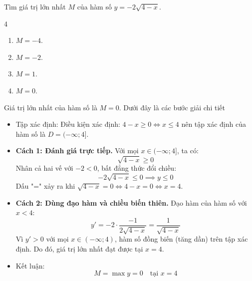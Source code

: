 \begin{baitap}
	Tìm giá trị lớn nhất $M$ của hàm số $y = -2\sqrt{4 - x}$.
	\begin{multicols}{4}
		\begin{enumerate}
			\item $M = -4$.
			\item $M = -2$.
			\item $M = 1$.
			\item $M = 0$.
		\end{enumerate}
	\end{multicols}
	\begin{traloi}
		Giá trị lớn nhất của hàm số là $M = 0$. Dưới đây là các bước giải chi tiết
		\begin{itemize}
			\item Tập xác định: Điều kiện xác định: $4 - x \ge 0 \iff x \le 4$ nên tập xác định của hàm số là $D = (-\infty; 4]$.
			\item \textbf{Cách 1: Đánh giá trực tiếp.}
			Với mọi $x \in (-\infty; 4]$, ta có:$$\sqrt{4 - x} \ge 0$$Nhân cả hai vế với $-2 < 0$, bất đẳng thức đổi chiều:$$-2\sqrt{4 - x} \le 0 \implies y \le 0$$Dấu "=" xảy ra khi $\sqrt{4 - x} = 0 \iff 4 - x = 0 \iff x = 4$.
			\item \textbf{Cách 2: Dùng đạo hàm và chiều biến thiên.} Đạo hàm của hàm số với $x < 4$:$$y' = -2 \cdot \dfrac{-1}{2\sqrt{4 - x}} = \dfrac{1}{\sqrt{4 - x}}$$Vì $y' > 0$ với mọi $x \in (-\infty; 4)$, hàm số đồng biến (tăng dần) trên tập xác định. Do đó, giá trị lớn nhất đạt được tại $x = 4$.
			\item Kết luận:$$M = \max y = 0 \quad \text{tại } x = 4$$
		\end{itemize}
	\end{traloi}
\end{baitap}


